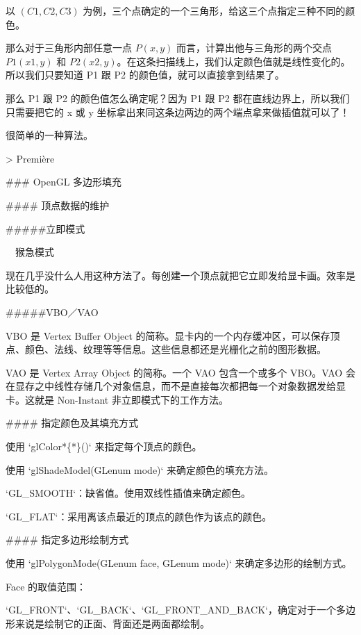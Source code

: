 \documentclass[
]{article}
\newenvironment{Shaded}{}{}
\newcommand{\BaseNTok}[1]{\textcolor[rgb]{0.25,0.63,0.44}{#1}}
\newcommand{\DataTypeTok}[1]{\textcolor[rgb]{0.56,0.13,0.00}{#1}}
\newcommand{\FunctionTok}[1]{\textcolor[rgb]{0.02,0.16,0.49}{#1}}
\newcommand{\NormalTok}[1]{#1}
\begin{document}
\begin{Shaded}
\begin{Highlighting}[]
\NormalTok{以 $(C1, C2, C3)$ 为例，三个点确定的一个三角形，给这三个点指定三种不同的颜色。}

\NormalTok{那么对于三角形内部任意一点 $P(x, y)$ 而言，计算出他与三角形的两个交点 $P1(x1, y)$ 和 $P2(x2, y)$。在这条扫描线上，我们认定颜色值就是线性变化的。所以我们只要知道 P1 跟 P2 的颜色值，就可以直接拿到结果了。}

\NormalTok{那么 P1 跟 P2 的颜色值怎么确定呢？因为 P1 跟 P2 都在直线边界上，所以我们只需要把它的 x 或 y 坐标拿出来同这条边两边的两个端点拿来做插值就可以了！}

\NormalTok{很简单的一种算法。}

\NormalTok{>}\DataTypeTok{ Première}

\FunctionTok{### OpenGL 多边形填充}

\FunctionTok{#### 顶点数据的维护}

\NormalTok{#####立即模式}

\NormalTok{~~猴急模式~~}

\NormalTok{现在几乎没什么人用这种方法了。每创建一个顶点就把它立即发给显卡画。效率是比较低的。}

\NormalTok{#####VBO／VAO}

\NormalTok{VBO 是 Vertex Buffer Object 的简称。显卡内的一个内存缓冲区，可以保存顶点、颜色、法线、纹理等等信息。这些信息都还是光栅化之前的图形数据。}

\NormalTok{VAO 是 Vertex Array Object 的简称。一个 VAO 包含一个或多个 VBO。VAO 会在显存之中线性存储几个对象信息，而不是直接每次都把每一个对象数据发给显卡。这就是 Non-Instant 非立即模式下的工作方法。}

\FunctionTok{#### 指定颜色及其填充方式}

\NormalTok{使用 }\BaseNTok{`glColor*\{*\}()`}\NormalTok{ 来指定每个顶点的颜色。}

\NormalTok{使用 }\BaseNTok{`glShadeModel(GLenum mode)`}\NormalTok{ 来确定颜色的填充方法。}

\BaseNTok{`GL_SMOOTH`}\NormalTok{：缺省值。使用双线性插值来确定颜色。}

\BaseNTok{`GL_FLAT`}\NormalTok{：采用离该点最近的顶点的颜色作为该点的颜色。}

\FunctionTok{#### 指定多边形绘制方式}

\NormalTok{使用 }\BaseNTok{`glPolygonMode(GLenum face, GLenum mode)`}\NormalTok{ 来确定多边形的绘制方式。}

\NormalTok{Face 的取值范围：}

\BaseNTok{`GL_FRONT`}\NormalTok{、}\BaseNTok{`GL_BACK`}\NormalTok{、}\BaseNTok{`GL_FRONT_AND_BACK`}\NormalTok{，确定对于一个多边形来说是绘制它的正面、背面还是两面都绘制。}


\end{Highlighting}
\end{Shaded}
\end{document}
